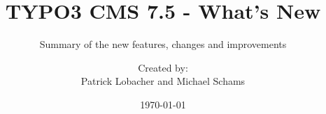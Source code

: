 %

%
%

\documentclass[t]{beamer}

\beamertemplatenavigationsymbolsempty

{
	\usetheme{typo3slides}
}

\title{TYPO3 CMS 7.5 - What's New}
\subtitle{Summary of the new features, changes and improvements}
\author{
	\centerline{Created by:}
	\centerline{Patrick Lobacher and Michael Schams}
}

\date{\today}



\sharefont


\begingroup
	[default]
	\begin{frame}
		\titlepage
	\end{frame}
\endgroup


\section*{TYPO3 CMS 7.5 - What's New}
\begin{frame}[fragile]
	\frametitle{Chapter Overview}
	\framesubtitle{Chapter Overview}

	\tableofcontents

\end{frame}

